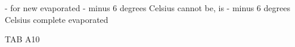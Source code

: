 - for new evaporated
- minus 6 degrees Celsius cannot be, is
- minus 6 degrees Celsius complete evaporated

TAB A10
